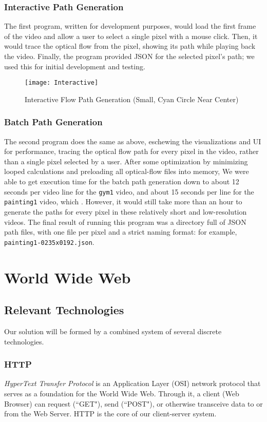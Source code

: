 \subsubsection{Interactive Path Generation}
The first program, written for development purposes, would load the first frame of the video and allow a user to select a single pixel with a mouse click. Then, it would trace the optical flow from the pixel, showing its path while playing back the video. Finally, the program provided JSON for the selected pixel's path; we used this for initial development and testing.

\begin{figure}[h]
\centering
\texttt{[image: Interactive]}
\caption{Interactive Flow Path Generation (Small, Cyan Circle Near Center)}
\end{figure}

\subsubsection{Batch Path Generation}
The second program does the same as above, eschewing the visualizations and UI for performance, tracing the optical flow path for every pixel in the video, rather than a single pixel selected by a user. After some optimization by minimizing looped calculations and preloading all optical-flow files into memory, We were able to get execution time for the batch path generation down to about 12 seconds per video line for the \texttt{gym1} video, and about 15 seconds per line for the \texttt{painting1} video, which . However, it would still take more than an hour to generate the paths for every pixel in these relatively short and low-resolution videos. The final result of running this program was a directory full of JSON path files, with one file per pixel and a strict naming format: for example, \texttt{painting1-0235x0192.json}.




\section{World Wide Web}
\subsection{Relevant Technologies}
Our solution will be formed by a combined system of several discrete technologies.
\subsubsection{HTTP}
\emph{HyperText Transfer Protocol} is an Application Layer (OSI) network protocol that serves as a foundation for the World Wide Web. Through it, a client (Web Browser) can request (``GET"), send (``POST"), or otherwise transceive data to or from the Web Server. HTTP is the core of our client-server system.
